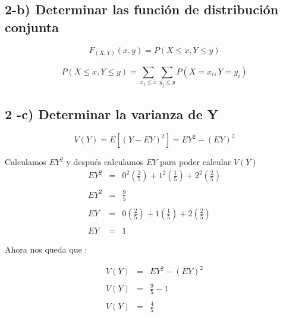 \documentclass[12pt]{article}
\begin{document}
\subsection*{2-b)  Determinar las funci\'on de distribuci\'on conjunta}

\begin{equation*}
    F_{\left(X,Y\right)} \left(x,y\right) = P \left(X \le x , Y \le y\right)
\end{equation*}

\begin{equation*}
    P \left(X \le x , Y \le y\right) =  \sum_{x_i \le x}^{} \sum_{y_j \le y}^{}  P \left(X = x_i , Y = y_i\right)
\end{equation*}



\subsection*{2 -c) Determinar la varianza de Y}

\begin{equation*}
    V\left(Y\right) = E \left[\left(Y - EY\right)^2\right] = EY^2 - \left(EY\right)^2
\end{equation*}

Calculamos $EY^2$ y despu\'es calculamos $EY$ para poder calcular $V\left(Y\right)$
\begin{equation*}
    \begin{array}{rcl}
        EY^2 & = & \displaystyle 0^2 \left(\frac{2}{5} \right)  + 1^2  \left(\frac{1}{5}\right) + 2^2 \left( \frac{2}{5}\right)
        \\
        \\
        EY^2 & = & \displaystyle \frac{9}{5}
        \\
        \\
        EY   & = & \displaystyle 0 \left(\frac{2}{5} \right)  + 1  \left(\frac{1}{5}\right) + 2 \left( \frac{2}{5}\right)
        \\
        \\
        EY   & = & 1
    \end{array}
\end{equation*}

Ahora nos queda que :

\begin{equation*}
    \begin{array}{rcl}
        V\left(Y\right) & = & EY^2 - \left(EY\right)^2
        \\
        \\
        V\left(Y\right) & = & \displaystyle \frac{9}{5} - 1
        \\
        \\
        V\left(Y\right) & = & \displaystyle \frac{4}{5}
        \\
    \end{array}
\end{equation*}
\end{document}
